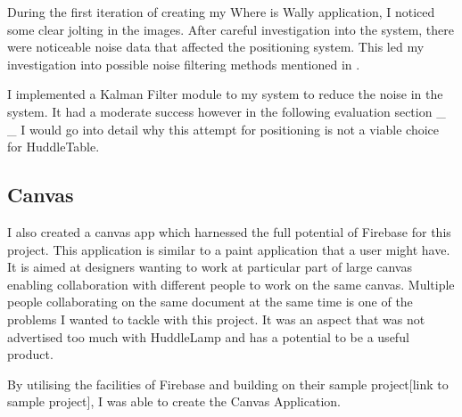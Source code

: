 During the first iteration of creating my Where is Wally application, I noticed some clear jolting in the images. After careful investigation into the system, there were noticeable noise data that affected the positioning system. This led my investigation into possible noise filtering methods mentioned in .

I implemented a Kalman Filter module to my system to reduce the noise in the system. It had a moderate success however in the following evaluation section \_ \_ I would go into detail why this attempt for positioning is not a viable choice for HuddleTable.

\subsection{Canvas}
I also created a canvas app which harnessed the full potential of Firebase for this project. This application is similar to a paint application that a user might have. It is aimed at designers wanting to work at particular part of large canvas enabling collaboration with different people to work on the same canvas. Multiple people collaborating on the same document at the same time is one of the problems I wanted to tackle with this project. It was an aspect that was not advertised too much with HuddleLamp and has a potential to be a useful product. 

By utilising the facilities of Firebase and building on their sample project[link to sample project], I was able to create the Canvas Application.


